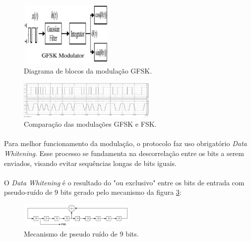 \begin{figure}[!ht]
    \centering
    \includegraphics[width=0.4\textwidth]{Figuras/GFSK1.PNG}
    \caption{Diagrama de blocos da modulação GFSK. \citep{IEEE2015}}
    \label{fig:figura5}
\end{figure}
    
\begin{figure}[!ht]
    \centering
    \includegraphics[width=0.6\textwidth]{Figuras/GFSK2.PNG}
    \caption{Comparação das modulações GFSK e FSK. \citep{IEEE2015}}
    \label{fig:figura6}
\end{figure}

\paragraph{} Para melhor funcionamento da modulação, o protocolo faz uso obrigatório \textit{Data Whitening}. Esse processo se fundamenta na descorrelação entre os bits a serem enviados, visando evitar sequências longas de bits iguais. 
 
\paragraph{} O \textit{Data Whitening} é o resultado do "ou exclusivo" entre os bits de entrada com pseudo-ruído de 9 bits gerado pelo mecanismo da figura \ref{fig:figura7}: 

\begin{figure}[!ht]
	\centering
	\includegraphics[width=0.5\textwidth]{Figuras/PN9.PNG}   
	\caption{Mecanismo de pseudo ruído de 9 bits. \citep{IEEE2015}}
	\label{fig:figura7}
\end{figure}

